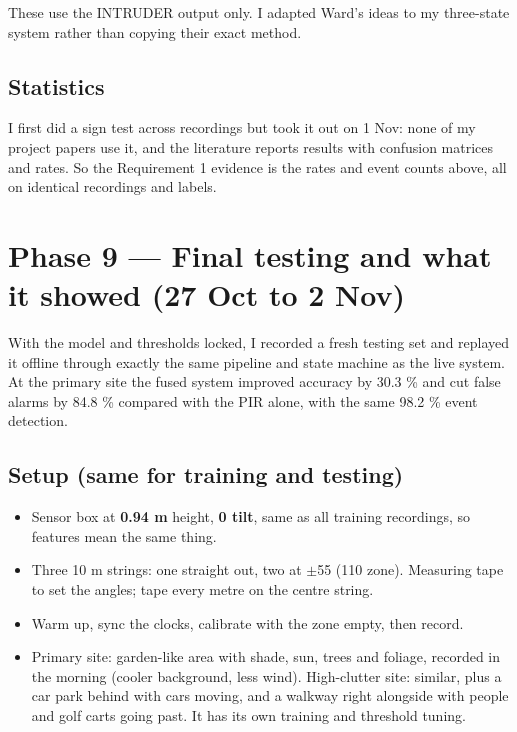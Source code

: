 \documentclass[11pt,a4paper]{article}
\providecommand{\tightlist}{\setlength{\itemsep}{0pt}\setlength{\parskip}{0pt}}
\begin{document}
These use the INTRUDER output
only. I adapted Ward's ideas
to my three-state system
rather than copying their
exact method.

\hypertarget{statistics}{%
\subsection{Statistics}\label{statistics}}

I first did a sign test across
recordings but took it out on
1 Nov: none of my project
papers use it, and the
literature reports results
with confusion matrices and
rates. So the Requirement 1
evidence is the rates and
event counts above, all on
identical recordings and
labels.

\hypertarget{phase-9-final-testing-and-what-it-showed-27-oct-to-2-nov}{%
\section{Phase 9 --- Final
testing and what it showed (27
Oct to 2
Nov)}\label{phase-9-final-testing-and-what-it-showed-27-oct-to-2-nov}}

With the model and thresholds
locked, I recorded a fresh
testing set and replayed it
offline through exactly the
same pipeline and state
machine as the live system. At
the primary site the fused
system improved accuracy by
30.3 \% and cut false alarms
by 84.8 \% compared with the
PIR alone, with the same 98.2
\% event detection.

\hypertarget{setup-same-for-training-and-testing}{%
\subsection{Setup (same for
training and
testing)}\label{setup-same-for-training-and-testing}}

\begin{itemize}
\tightlist
\item
  Sensor box at \textbf{0.94
  m} height, \textbf{0\textdegree{} tilt},
  same as all training
  recordings, so features mean
  the same thing.
\item
  Three 10 m strings: one
  straight out, two at $\pm$55\textdegree{}
  (110\textdegree{} zone). Measuring tape
  to set the angles; tape
  every metre on the centre
  string.
\item
  Warm up, sync the clocks,
  calibrate with the zone
  empty, then record.
\item
  Primary site: garden-like
  area with shade, sun, trees
  and foliage, recorded in the
  morning (cooler background,
  less wind). High-clutter
  site: similar, plus a car
  park behind with cars
  moving, and a walkway right
  alongside with people and
  golf carts going past. It
  has its own training and
  threshold tuning.
\end{itemize}
\end{document}

